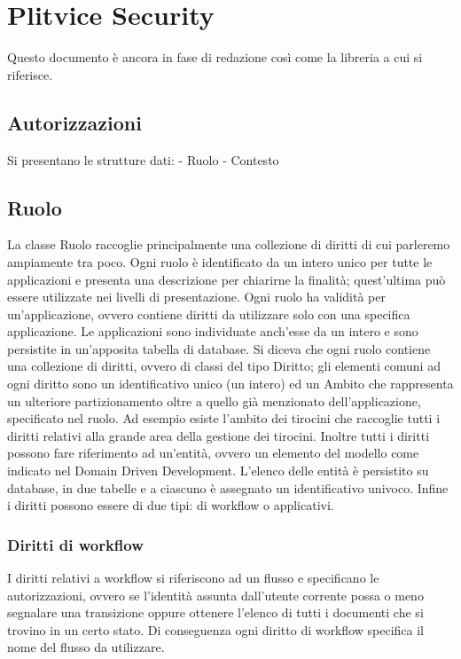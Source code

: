 \chapter{Plitvice Security}

Questo documento è ancora in fase di redazione così come la libreria a cui si riferisce.

\section{Autorizzazioni}
Si presentano le strutture dati:
- Ruolo
- Contesto

\section{Ruolo}
La classe Ruolo raccoglie principalmente una collezione di diritti di cui parleremo ampiamente tra poco. Ogni ruolo è identificato da un intero unico per tutte le applicazioni e presenta una descrizione per chiarirne la finalità; quest'ultima può essere utilizzate nei livelli di presentazione. Ogni ruolo ha validità per un'applicazione, ovvero contiene diritti da utilizzare solo con una specifica applicazione. Le applicazioni sono individuate anch'esse da un intero e sono persistite in un'apposita tabella di database.
Si diceva che ogni ruolo contiene una collezione di diritti, ovvero di classi del tipo Diritto;  gli elementi comuni ad ogni diritto sono un identificativo unico (un intero) ed un Ambito che rappresenta un ulteriore partizionamento oltre a quello già menzionato dell'applicazione, specificato nel ruolo. Ad esempio esiste l'ambito dei tirocini che raccoglie tutti i diritti relativi alla grande area della gestione dei tirocini. Inoltre tutti i diritti possono fare riferimento ad un'entità, ovvero un elemento del modello come indicato nel Domain Driven Development. L'elenco delle entità è persistito su database, in due tabelle  e a ciascuno è assegnato un identificativo univoco.
Infine i diritti possono essere di due tipi: di workflow o applicativi.

\subsection{Diritti di workflow}
 I diritti relativi a workflow  si riferiscono ad un flusso e specificano le autorizzazioni, ovvero  se l'identità assunta dall'utente corrente possa o meno segnalare una transizione oppure ottenere l'elenco di tutti i documenti che si trovino in un certo stato. Di conseguenza ogni diritto di workflow specifica il nome del flusso da utilizzare.


